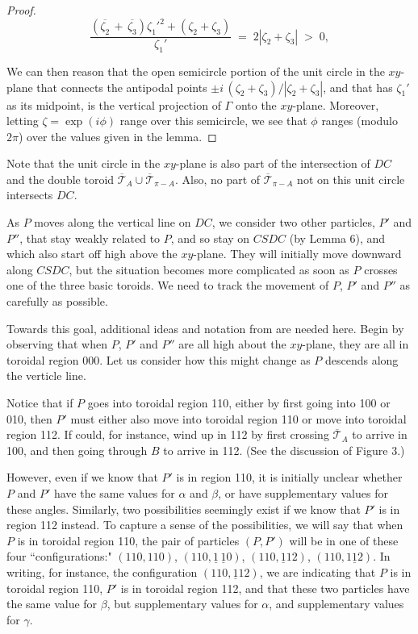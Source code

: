 \documentclass[a4paper, twoside]{article}
\begin{document}
\begin{proof}
\vspace{-4mm} 

$$ \frac{(\overline{\zeta_2} \, + \, \overline{\zeta_3}) \zeta_1'^2 + (\zeta_2 + \zeta_3)} {\zeta_1'} \; = \; 2 |\zeta_2+\zeta_3| \; > \; 0, $$ 

\vspace{2mm} 

\noindent We can then reason that the open semicircle portion of the unit circle in the $xy$-plane that connects the antipodal points $\pm i \, (\zeta_2 + \zeta_3) / |\zeta_2 + \zeta_3|$, and that has $\zeta_1'$ as its midpoint, is the vertical projection of $\Gamma$ onto the $xy$-plane. Moreover, letting $\zeta = \exp(i \phi)$ range over this semicircle, we see that $\phi$ ranges (modulo $2\pi$) over the values given in the lemma. 
 
\end{proof} 

\noindent Note that the unit circle in the $xy$-plane is also part of the intersection of $DC$ and the double toroid
$\overline{\mathcal{T}}_A \cup \overline{\mathcal{T}}_{\pi-A}$. Also, no part of $\overline{\mathcal{T}}_{\pi-A}$ not on this unit circle intersects $DC$. 

As $P$ moves along the vertical line on $DC$, we consider two other particles, $P'$ and $P''$, that stay weakly related to $P$, and so stay on $CSDC$ (by Lemma 6), and which also start off high above the $xy$-plane. They will initially move downward along $CSDC$, but the situation becomes more complicated as soon as $P$ crosses one of the three basic toroids. We need to track the movement of $P$, $P'$ and $P''$ as carefully as possible. 

Towards this goal, additional ideas and notation from \cite{RW} are needed here. Begin by observing that when $P$, $P'$ and $P''$ are all high about the $xy$-plane, they are all in toroidal region 000. Let us consider how this might change as $P$ descends along the verticle line. 

Notice that if $P$ goes into toroidal region 110, either by first going into 100 or 010, then $P'$ must either also move into  toroidal region 110 or move into toroidal region 112. If could, for instance, wind up in 112 by first crossing $\overline{\mathcal{T}}_A$ to arrive in 100, and then going through $B$ to arrive in 112. (See the discussion of Figure 3.)

However, even if we know that $P'$ is in region 110, it is initially unclear whether $P$ and $P'$ have the same values for $\alpha$ and $\beta$, or have supplementary values for these angles. Similarly, two possibilities seemingly exist if we know that $P'$ is in region 112 instead. To capture a sense of the possibilities, we will say that when $P$ is in toroidal region 110, the pair of particles $(P, P')$ will be in one of these four ``configurations:" $(110, 110)$, $(110, \underline{1}\,\underline{1}0)$, $(110, \underline{1}12)$, $(110, 1\underline{1}2)$. In writing, for instance, the configuration $(110, \underline{1}12)$, we are indicating that $P$ is in toroidal region 110, $P'$ is in toroidal region 112, and that these two particles have the same value for $\beta$, but supplementary values for $\alpha$, and supplementary values for $\gamma$. 
\end{document}
